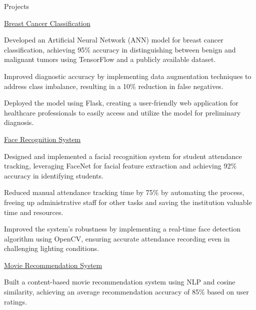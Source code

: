 \documentclass{resume} %
\begin{document}
    \begin{rSection}{Projects}
                    \begin{rSubsection}
                                    {\href{Github Link}{Breast Cancer Classification}}
                                {}{}{}
                                    \item Developed an Artificial Neural Network (ANN) model for breast cancer classification, achieving 95\% accuracy in distinguishing between benign and malignant tumors using TensorFlow and a publicly available dataset.
                                    \item Improved diagnostic accuracy by implementing data augmentation techniques to address class imbalance, resulting in a 10\% reduction in false negatives.
                                    \item Deployed the model using Flask, creating a user-friendly web application for healthcare professionals to easily access and utilize the model for preliminary diagnosis.
                            \end{rSubsection}
                    \begin{rSubsection}
                                    {\href{Github Link}{Face Recognition System}}
                                {}{}{}
                                    \item Designed and implemented a facial recognition system for student attendance tracking, leveraging FaceNet for facial feature extraction and achieving 92\% accuracy in identifying students.
                                    \item Reduced manual attendance tracking time by 75\% by automating the process, freeing up administrative staff for other tasks and saving the institution valuable time and resources.
                                    \item Improved the system's robustness by implementing a real-time face detection algorithm using OpenCV, ensuring accurate attendance recording even in challenging lighting conditions.
                            \end{rSubsection}
                    \begin{rSubsection}
                                    {\href{Github Link}{Movie Recommendation System}}
                                {}{}{}
                                    \item Built a content-based movie recommendation system using NLP and cosine similarity, achieving an average recommendation accuracy of 85\% based on user ratings.

\end{rSubsection}
\end{rSection}
\end{document}

